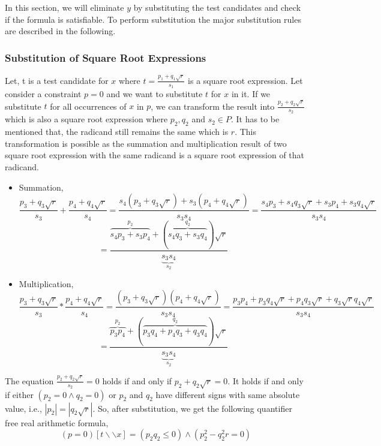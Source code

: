 In this section, we will eliminate $y$ by substituting the test candidates and check if the formula is satisfiable. To perform substitution the major substitution rules are described in the following.
\subsubsection{Substitution of Square Root Expressions}
Let, t is a test candidate for $x$ where $t = \frac{p_{1}+q_{1}\sqrt{r}}{s_{1}}$ is a square root expression. Let consider a constraint $p=0$ and we want to substitute $t$ for $x$ in it. If we substitute $t$ for all occurrences of $x$ in $p$, we can transform the result into $\frac{p_{2}+q_{2}\sqrt{r}}{s_{2}}$ which is also a square root expression where $p_{2}, q_{2}$ and $s_{2}\in P$. It has to be mentioned that, the radicand still remains the same which is $r$.
This transformation is possible as the summation and multiplication result of two square root expression with the same radicand is a square root expression of that radicand.
\begin{itemize}
	\item Summation,
	$$ \frac{p_{3}+q_{3}\sqrt{r}}{s_{3}}+\frac{p_{4}+q_{4}\sqrt{r}}{s_{4}} = \frac{s_{4}(p_{3}+q_{3}\sqrt{r})+s_{3}(p_{4}+q_{4}\sqrt{r})}{s_{3}s_{4}} = \frac{s_{4}p_{3}+s_{4}q_{3}\sqrt{r}+s_{3}p_{4}+s_{3}q_{4}\sqrt{r}}{s_{3}s_{4}}$$
	$$ =\frac{\overbrace{s_{4}p_{3}+s_{3}p_{4}}\limits^{p_{2}}+(\overbrace{s_{4}q_{3}+s_{3}q_{4}}\limits^{q_{2}})\sqrt{r}}{\underbrace{s_{3}s_{4}}\limits_{s_{2}}}$$
	\item Multiplication,
	$$ \frac{p_{3}+q_{3}\sqrt{r}}{s_{3}}*\frac{p_{4}+q_{4}\sqrt{r}}{s_{4}} =
	\frac{(p_{3}+q_{3}\sqrt{r})(p_{4}+q_{4}\sqrt{r})}{s_{3}s_{4}} =
	\frac{p_{3}p_{4}+p_{3}q_{4}\sqrt{r}+p_{4}q_{3}\sqrt{r}+q_{3}\sqrt{r}q_{4}\sqrt{r}}{s_{3}s_{4}}$$
	$$
	=\frac{\overbrace{p_{3}p_{4}}\limits^{p_{2}}+(\overbrace{p_{3}q_{4}+p_{4}q_{3}+q_{3}q_{4}}\limits^{q_{2}})\sqrt{r}}{\underbrace{s_{3}s_{4}}\limits_{s_{2}}}$$
\end{itemize}

The equation $\frac{p_{2}+q_{2}\sqrt{r}}{s_{2}} = 0$ holds if and only if $p_{2}+q_{2}\sqrt{r} = 0$. It holds if and only if either $(p_{2} = 0\wedge q_{2} = 0)$ or $p_{2}$ and $q_{2}$ have different signs with same absolute value, i.e., $|p_{2}|=|q_{2}\sqrt{r}|$. So, after substitution, we get the following quantifier free real arithmetic formula,
$$ (p = 0)[t\backslash\backslash x] = (p_{2}q_{2}\leq 0) \wedge (p_{2}^{2} - q_{2}^{2} r = 0) $$
